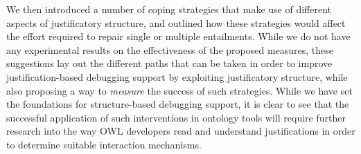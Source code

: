 We then introduced a number of coping strategies that make use of different aspects of justificatory structure, and outlined how these strategies would affect the effort required to repair single or multiple entailments. While we do not have any experimental results on the effectiveness of the proposed measures, these suggestions lay out the different paths that can be taken in order to improve justification-based debugging support by exploiting justificatory structure, while also proposing a way to \emph{measure} the success of such strategies. While we have set the foundations for structure-based debugging support, it is clear to see that the successful application of such interventions in ontology tools will require further research into the way OWL developers read and understand justifications in order to determine suitable interaction mechanisms.
